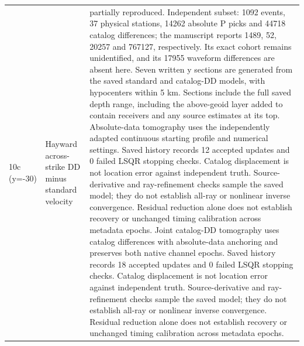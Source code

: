 \begin{longtable}{>{\raggedright\arraybackslash}p{}>{\raggedright\arraybackslash}p{}>{\raggedright\arraybackslash}p{}}
10c (y=-30) & Hayward across-strike DD minus standard velocity & partially reproduced. Independent subset: 1092 events, 37 physical stations, 14262 absolute P picks and 44718 catalog differences; the manuscript reports 1489, 52, 20257 and 767127, respectively. Its exact cohort remains unidentified, and its 17955 waveform differences are absent here. Seven written y sections are generated from the saved standard and catalog-DD models, with hypocenters within 5 km. Sections include the full saved depth range, including the above-geoid layer added to contain receivers and any source estimates at its top. Absolute-data tomography uses the independently adapted continuous starting profile and numerical settings. Saved history records 12 accepted updates and 0 failed LSQR stopping checks. Catalog displacement is not location error against independent truth. Source-derivative and ray-refinement checks sample the saved model; they do not establish all-ray or nonlinear inverse convergence. Residual reduction alone does not establish recovery or unchanged timing calibration across metadata epochs. Joint catalog-DD tomography uses catalog differences with absolute-data anchoring and preserves both native channel epochs. Saved history records 18 accepted updates and 0 failed LSQR stopping checks. Catalog displacement is not location error against independent truth. Source-derivative and ray-refinement checks sample the saved model; they do not establish all-ray or nonlinear inverse convergence. Residual reduction alone does not establish recovery or unchanged timing calibration across metadata epochs.\\

\end{longtable}
